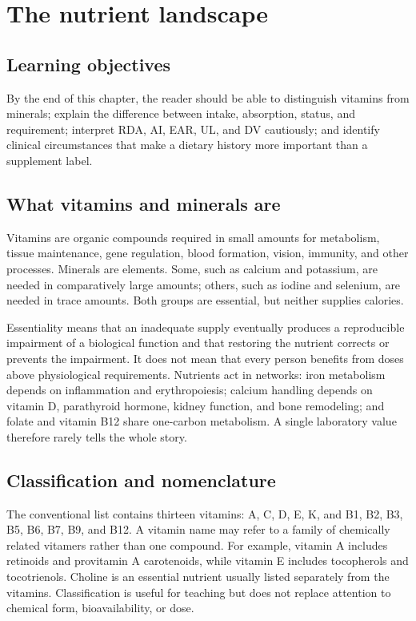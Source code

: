 \chapter{The nutrient landscape}

\section{Learning objectives}
By the end of this chapter, the reader should be able to distinguish vitamins from minerals; explain the difference between intake, absorption, status, and requirement; interpret RDA, AI, EAR, UL, and DV cautiously; and identify clinical circumstances that make a dietary history more important than a supplement label.

\section{What vitamins and minerals are}
Vitamins are organic compounds required in small amounts for metabolism, tissue maintenance, gene regulation, blood formation, vision, immunity, and other processes. Minerals are elements. Some, such as calcium and potassium, are needed in comparatively large amounts; others, such as iodine and selenium, are needed in trace amounts. Both groups are essential, but neither supplies calories. \cite{odsList}

Essentiality means that an inadequate supply eventually produces a reproducible impairment of a biological function and that restoring the nutrient corrects or prevents the impairment. It does not mean that every person benefits from doses above physiological requirements. Nutrients act in networks: iron metabolism depends on inflammation and erythropoiesis; calcium handling depends on vitamin D, parathyroid hormone, kidney function, and bone remodeling; and folate and vitamin B12 share one-carbon metabolism. A single laboratory value therefore rarely tells the whole story. \cite{odsIron,odsCa,odsB12,odsFolate,odsD}

\section{Classification and nomenclature}
The conventional list contains thirteen vitamins: A, C, D, E, K, and B1, B2, B3, B5, B6, B7, B9, and B12. A vitamin name may refer to a family of chemically related vitamers rather than one compound. For example, vitamin A includes retinoids and provitamin A carotenoids, while vitamin E includes tocopherols and tocotrienols. Choline is an essential nutrient usually listed separately from the vitamins. Classification is useful for teaching but does not replace attention to chemical form, bioavailability, or dose. \cite{odsList,odsA,odsE,odsCholine}

